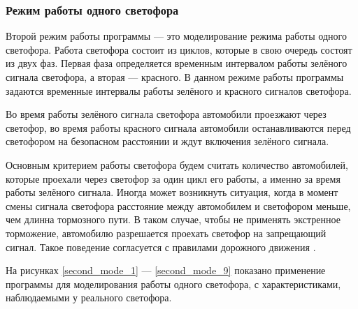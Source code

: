 \documentclass[12pt, a4paper]{extarticle}
\numberwithin{equation}{section}
\numberwithin{figure}{section}
\begin{document}
\subsubsection{Режим работы одного светофора}

Второй режим работы программы --- это моделирование режима работы одного светофора. Работа светофора состоит из циклов, которые в свою очередь состоят из двух фаз. Первая фаза определяется временным интервалом работы зелёного сигнала светофора, а вторая --- красного. В данном режиме работы программы задаются временные интервалы работы зелёного и красного сигналов светофора. 

Во время работы зелёного сигнала светофора автомобили проезжают через светофор, во время работы красного сигнала автомобили останавливаются перед светофором на безопасном расстоянии и ждут включения зелёного сигнала. 

Основным критерием работы светофора будем считать количество автомобилей, которые проехали через светофор за один цикл его работы, а именно за время работы зелёного сигнала. Иногда может возникнуть ситуация, когда в момент смены сигнала светофора расстояние между автомобилем и светофором меньше, чем длинна тормозного пути. В таком случае, чтобы не применять экстренное торможение, автомобилю разрешается проехать светофор на запрещающий сигнал. Такое поведение согласуется с правилами дорожного движения \cite{PDD}.

На рисунках \ref{second_mode_1} --- \ref{second_mode_9} показано применение программы для моделирования работы одного светофора, с характеристиками, наблюдаемыми у реального светофора.
\end{document}
